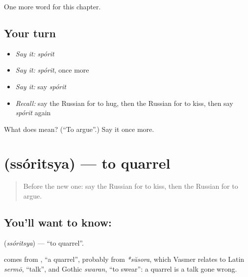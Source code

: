 \begin{grammarlens}[title={What you've built}]
One more word for this chapter.
\end{grammarlens}

\subsection*{Your turn}
\begin{itemize}
\raggedright
  \item \emph{Say it:} \emph{spórit}
  \item \emph{Say it:} \emph{spórit}, once more
  \item \emph{Say it:} say \emph{spórit}
  \item \emph{Recall:} say the Russian for to hug, then the Russian for to kiss, then say \emph{spórit} again
\end{itemize}

\begin{tcolorbox}[breakable,colback=teal!4,colframe=teal!35!black,title={Before you move on}]
What does  mean? (\textquotedblleft{}To argue\textquotedblright{}.) Say it once more.
\end{tcolorbox}
\section[\texorpdfstring{\ru{ссориться} (ssóritsya)}{ссориться (ssóritsya)}]{ (ssóritsya) — to quarrel}

\label{lesson:RU-C177-ssoritsya}



\begin{quote}
Before the new one: say the Russian for to kiss, then the Russian for to argue.
\end{quote}

\subsection*{You'll want to know: }
\textbf{} (\emph{ssóritsya}) — \textquotedblleft{}to quarrel\textquotedblright{}.

\begin{cousinweb}
\textbf{} comes from \emph{}, \textquotedblleft{}a quarrel\textquotedblright{}, probably from \emph{*sŭsora}, which Vasmer relates to Latin \emph{sermō}, \textquotedblleft{}talk\textquotedblright{}, and Gothic \emph{swaran}, \textquotedblleft{}to swear\textquotedblright{}: a quarrel is a talk gone wrong.
\end{cousinweb}

